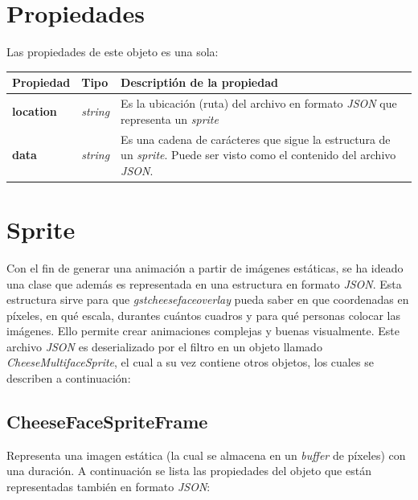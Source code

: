 \documentclass[a4paper,openright,12pt]{report}
\begin{document}
\section{Propiedades}
Las propiedades de este objeto es una sola:
\begin{center}
  \begin{longtable}{| p{} | p{} | p{} |}
  \hline

  \textbf{Propiedad} &
  \textbf{Tipo} &
  \textbf{Descriptión de la propiedad}
  \\ \hline

  \textbf{location} &
  \textit{string} &
  Es la ubicación (ruta) del archivo en formato \textit{JSON} que representa un
  \textit{sprite}
  \\ \hline

  \textbf{data} &
  \textit{string} &
  Es una cadena de carácteres que sigue la estructura de un \textit{sprite}.
  Puede ser visto como el contenido del archivo \textit{JSON}.
  \\ \hline
  \end{longtable}
\end{center}

\section{Sprite}
Con el fin de generar una animación a partir de imágenes estáticas, se ha ideado
una clase que además es representada en una estructura en formato \textit{JSON}.
Esta estructura sirve para que \textit{gstcheesefaceoverlay} pueda saber en que
coordenadas en píxeles, en qué escala, durantes cuántos cuadros y para qué
personas colocar las imágenes. Ello permite crear animaciones complejas y
buenas visualmente. Este archivo \textit{JSON} es deserializado por
el filtro en un objeto llamado \textit{CheeseMultifaceSprite}, el cual a su vez
contiene otros objetos, los cuales se describen a continuación:\\

\subsection{CheeseFaceSpriteFrame}
Representa una imagen estática (la cual se almacena en un \textit{buffer} de
píxeles) con una duración. A continuación se lista las propiedades del objeto
que están representadas también en formato \textit{JSON}:
\end{document}
